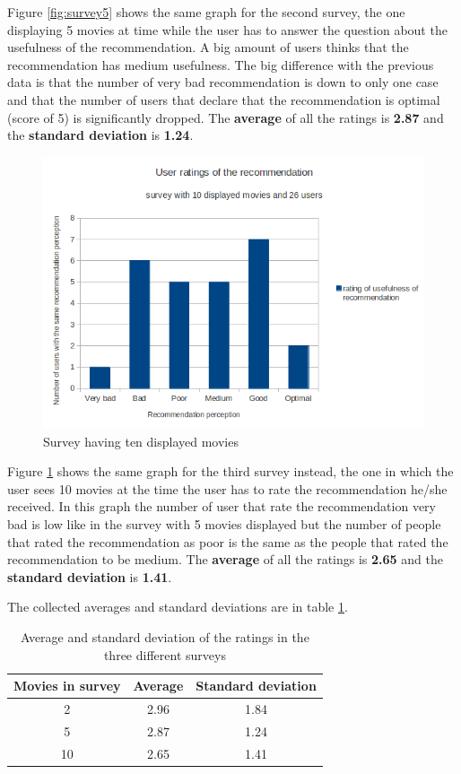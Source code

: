 Figure \ref{fig:survey5} shows the same graph for the second survey, the one displaying 5 movies at time while the user has to answer the question about the usefulness of the recommendation. A big amount of users thinks that the recommendation has medium usefulness. The big difference with the previous data is that the number of very bad recommendation is down to only one case and that the number of users that declare that the recommendation is optimal (score of 5) is significantly dropped. The \textbf{average} of all the ratings is \textbf{2.87} and the \textbf{standard deviation} is \textbf{1.24}.

\begin{figure}
  \centering
  \includegraphics[width=\textwidth]{figures/survey10_graph1.png}
  \caption{Survey having ten displayed movies}
  \label{fig:survey10}
\end{figure}

Figure \ref{fig:survey10} shows the same graph for the third survey instead, the one in which the user sees 10 movies at the time the user has to rate the recommendation he/she received. In this graph the number of user that rate the recommendation very bad is low like in the survey with 5 movies displayed but the number of people that rated the recommendation as poor is the same as the people that rated the recommendation to be medium. The \textbf{average} of all the ratings is \textbf{2.65} and the \textbf{standard deviation} is \textbf{1.41}.

The collected averages and standard deviations are in table \ref{tab:average_std}.

\begin{table}
  \centering
  \begin{tabular}{| c | c | c |}
    \hline
    Movies in survey & Average & Standard deviation \\ \hline
    2 & 2.96 & 1.84 \\ \hline
    5 & 2.87 & 1.24 \\ \hline
    10 & 2.65 & 1.41 \\ \hline
  \end{tabular}
  \caption{Average and standard deviation of the ratings in the three different surveys}
  \label{tab:average_std}
\end{table}

